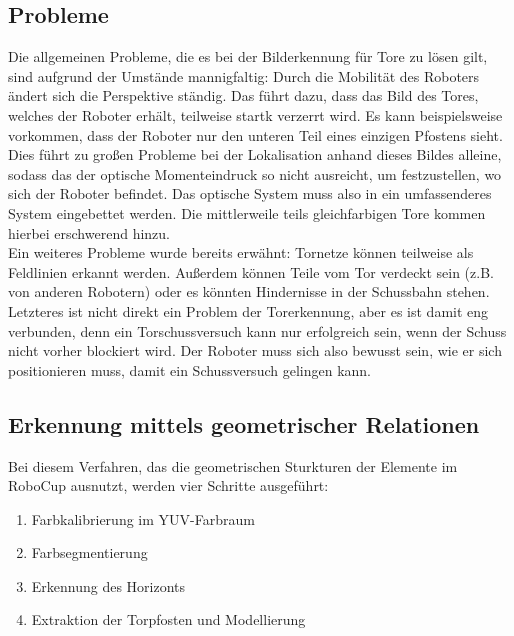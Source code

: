 \documentclass[a4paper,12pt]{article}
\begin{document}
\subsection{Probleme}
Die allgemeinen Probleme, die es bei der Bilderkennung für Tore zu lösen gilt, sind aufgrund
der Umstände mannigfaltig: Durch die Mobilität des Roboters ändert sich die Perspektive ständig. Das
führt dazu, dass das Bild des Tores, welches der Roboter erhält, teilweise startk verzerrt wird. Es
kann beispielsweise vorkommen, dass der Roboter nur den unteren Teil eines einzigen Pfostens sieht.
Dies führt zu großen Probleme bei der Lokalisation anhand dieses Bildes alleine, sodass das der
optische Momenteindruck so nicht ausreicht, um festzustellen, wo sich der Roboter befindet. Das
optische System muss also in ein umfassenderes System eingebettet werden. Die mittlerweile teils
gleichfarbigen Tore kommen hierbei erschwerend hinzu. \\

Ein weiteres Probleme wurde bereits erwähnt: Tornetze können teilweise als Feldlinien erkannt
werden. Außerdem können Teile vom Tor verdeckt sein (z.B. von anderen Robotern) oder es könnten
Hindernisse in der Schussbahn stehen. Letzteres ist nicht direkt ein Problem der Torerkennung, aber
es ist damit eng verbunden, denn ein Torschussversuch kann nur erfolgreich sein, wenn der Schuss
nicht vorher blockiert wird. Der Roboter muss sich also bewusst sein, wie er sich positionieren
muss, damit ein Schussversuch gelingen kann.

\subsection{Erkennung mittels geometrischer Relationen}
Bei diesem Verfahren, das die geometrischen Sturkturen der Elemente im RoboCup ausnutzt, werden
vier Schritte ausgeführt:
\begin{enumerate}
	\item Farbkalibrierung im YUV-Farbraum
	\item Farbsegmentierung
	\item Erkennung des Horizonts
	\item Extraktion der Torpfosten und Modellierung
\end{enumerate}
\end{document}
